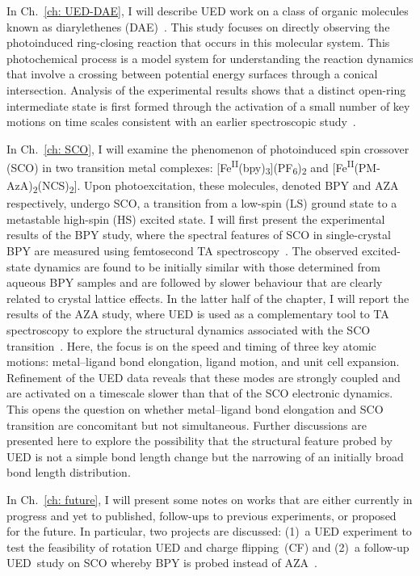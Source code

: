 In Ch.~\ref{ch: UED-DAE}, I will describe UED work on a class of organic molecules known
as diarylethenes (DAE)~\cite{Jean-Ruel2013}. This study focuses on directly observing
the photoinduced ring-closing reaction that occurs in this molecular system.
This photochemical process is a model system for understanding the reaction dynamics that involve
a crossing between potential energy surfaces through a conical intersection.
Analysis of the experimental results shows that a distinct open-ring intermediate state
is first formed through the activation of a small number of key motions on time scales
consistent with an earlier spectroscopic study~\cite{Jean-Ruel2011}.

In Ch.~\ref{ch: SCO}, I will examine the phenomenon of photoinduced spin crossover (SCO) in
two transition metal complexes:
[Fe\textsuperscript{II}(bpy)\textsubscript{3}](PF\textsubscript{6})\textsubscript{2}
and [Fe\textsuperscript{II}(PM-AzA)\textsubscript{2}(NCS)\textsubscript{2}]. Upon photoexcitation,
these molecules, denoted BPY and AZA respectively, undergo SCO, a transition from
a low-spin (LS) ground state to a metastable high-spin (HS) excited state. I will first
present the experimental results of the BPY study, where the spectral features of SCO
in single-crystal BPY are measured using femtosecond TA spectroscopy~\cite{Field2016}.
The observed excited-state dynamics are found to be initially similar with those determined
from aqueous BPY samples and are followed by slower behaviour that are clearly related
to crystal lattice effects.
In the latter half of the chapter, I will report the results of the AZA study,
where UED is used as a complementary tool to TA spectroscopy to explore the structural dynamics
associated with the SCO transition~\cite{Jiang2017}. Here, the focus is on the speed and timing of
three key atomic motions: metal--ligand bond elongation, ligand motion, and unit cell expansion.
Refinement of the UED data reveals that these modes are strongly coupled and are activated on
a timescale slower than that of the SCO electronic dynamics. This opens the question on
whether metal--ligand bond elongation and SCO transition are concomitant but not simultaneous.
Further discussions are presented here to explore the possibility that the structural feature
probed by UED is not a simple bond length change but the narrowing of an initially broad
bond length distribution.

In Ch.~\ref{ch: future}, I will present some notes on works that are either
currently in progress and yet to published, follow-ups to previous experiments,
or proposed for the future.
%
In particular, two projects are discussed:
(1)~a UED experiment to test the feasibility of rotation UED and charge flipping~(CF)
and (2)~a follow-up UED~study on SCO whereby BPY is probed instead of AZA~\cite{Jiang2019}.

